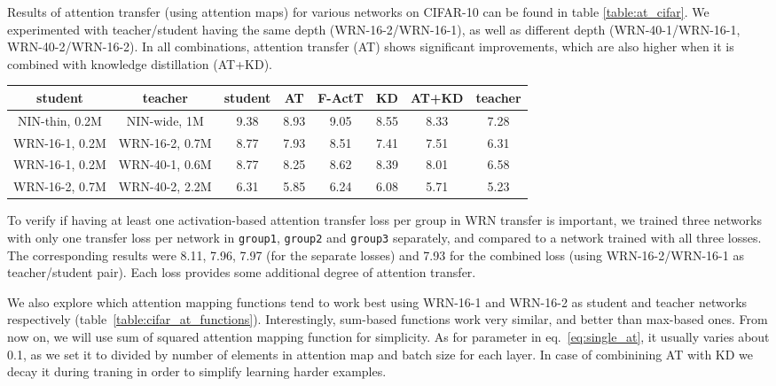 \documentclass{article} \usepackage{iclr2017_conference}
\begin{document}
Results of attention transfer (using   attention maps) for various networks on CIFAR-10 can be found in table \ref{table:at_cifar}. We experimented with teacher/student having the same depth (WRN-16-2/WRN-16-1), as well as different depth (WRN-40-1/WRN-16-1, WRN-40-2/WRN-16-2). In all combinations, attention transfer (AT) shows significant improvements, which are also higher when it is combined with knowledge distillation (AT+KD).

\begin{table*}[ht]
  \centering\small
  \begin{tabular}{|c|c|c|c|c|c|c|c|}
    \hline
    student & teacher & student & AT & F-ActT & KD & AT+KD & teacher  \\ \hline
    NIN-thin, 0.2M & NIN-wide, 1M   & 9.38 & 8.93 & 9.05 & 8.55 & 8.33 & 7.28 \\
    WRN-16-1, 0.2M & WRN-16-2, 0.7M & 8.77 & 7.93 & 8.51 & 7.41 & 7.51 & 6.31 \\
    WRN-16-1, 0.2M & WRN-40-1, 0.6M & 8.77 & 8.25 & 8.62 & 8.39 & 8.01 & 6.58 \\
    WRN-16-2, 0.7M & WRN-40-2, 2.2M & 6.31 & 5.85 & 6.24 & 6.08 & 5.71 & 5.23 \\ \hline
  \end{tabular}
  \caption{Activation-based attention transfer (AT) with various architectures on CIFAR-10. Error is computed as median of 5 runs with different seed. F-ActT means full-activation transfer (see~\S\ref{sec:F-ActT}).}
  \label{table:at_cifar}
\end{table*}

To verify if having at least one activation-based attention transfer loss per group in WRN transfer is important, we trained three networks with only one  transfer loss per network in \texttt{group1}, \texttt{group2} and \texttt{group3} separately, and compared to a network trained with all three losses. The corresponding results were 8.11, 7.96, 7.97 (for the separate losses) and  7.93 for the combined loss (using WRN-16-2/WRN-16-1  as teacher/student pair). Each loss provides some additional degree of attention transfer.

We also explore which attention mapping functions tend to work best using WRN-16-1 and WRN-16-2 as student and teacher networks respectively (table~\ref{table:cifar_at_functions}). Interestingly, sum-based functions work very similar, and better than max-based ones. From now on, we  will use sum of squared attention mapping function  for simplicity. As for parameter  in eq.~\ref{eq:single_at}, it usually varies about 0.1, as we set it to  divided by number of elements in attention map and batch size for each layer. In case of combinining AT with KD we decay it during traning in order to simplify learning harder examples.
\end{document}
